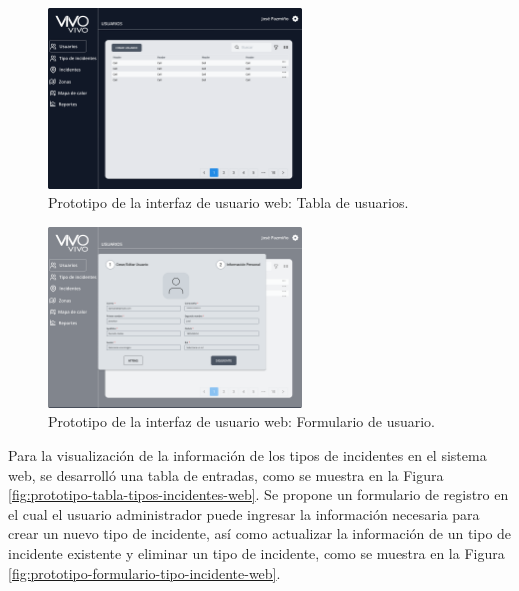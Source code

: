 \begin{figure}[H]
    \centering
    \includegraphics[width=0.6\textwidth]{chapters/III-resultados-y-discusion/resources/images/prototipo-tabla-usuarios-web.png}
    \caption{Prototipo de la interfaz de usuario web: Tabla de usuarios.}
    \label{fig:prototipo-tabla-usuarios-web}
\end{figure}

\begin{figure}[H]
    \centering
    \includegraphics[width=0.6\textwidth]{chapters/III-resultados-y-discusion/resources/images/prototipo-formulario-usuario-web.png}
    \caption{Prototipo de la interfaz de usuario web: Formulario de usuario.}
    \label{fig:prototipo-formulario-usuario-web}
\end{figure}

Para la visualización de la información de los tipos de incidentes en el sistema web, se desarrolló una tabla de entradas, como se muestra en la Figura
\ref{fig:prototipo-tabla-tipos-incidentes-web}. Se propone un formulario de registro en el cual el usuario administrador puede ingresar la información
necesaria para crear un nuevo tipo de incidente, así como actualizar la información de un tipo de incidente existente y eliminar un tipo de incidente,
como se muestra en la Figura \ref{fig:prototipo-formulario-tipo-incidente-web}.


